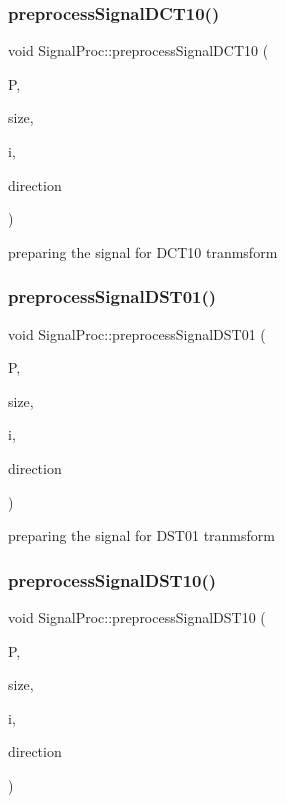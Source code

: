 \subsubsection{\texorpdfstring{preprocess\+Signal\+D\+C\+T10()}{preprocessSignalDCT10()}}
{\footnotesize\ttfamily void Signal\+Proc\+::preprocess\+Signal\+D\+C\+T10 (\begin{DoxyParamCaption}\item[{\mbox{\hyperlink{classChunkedArray}{Chunked\+Array}} \&}]{P,  }\item[{const int}]{size,  }\item[{const int}]{i,  }\item[{const int}]{direction }\end{DoxyParamCaption})}

preparing the signal for D\+C\+T10 tranmsform \mbox{\label{classSignalProc_a163a1a849ac2a30aa756c8d45b40dde1}} 
\subsubsection{\texorpdfstring{preprocess\+Signal\+D\+S\+T01()}{preprocessSignalDST01()}}
{\footnotesize\ttfamily void Signal\+Proc\+::preprocess\+Signal\+D\+S\+T01 (\begin{DoxyParamCaption}\item[{\mbox{\hyperlink{classChunkedArray}{Chunked\+Array}} \&}]{P,  }\item[{const int}]{size,  }\item[{const int}]{i,  }\item[{const int}]{direction }\end{DoxyParamCaption})}

preparing the signal for D\+S\+T01 tranmsform \mbox{\label{classSignalProc_a76b93fa1929f4f80d1ddeb93c5d3eac1}} 
\subsubsection{\texorpdfstring{preprocess\+Signal\+D\+S\+T10()}{preprocessSignalDST10()}}
{\footnotesize\ttfamily void Signal\+Proc\+::preprocess\+Signal\+D\+S\+T10 (\begin{DoxyParamCaption}\item[{\mbox{\hyperlink{classChunkedArray}{Chunked\+Array}} \&}]{P,  }\item[{const int}]{size,  }\item[{const int}]{i,  }\item[{const int}]{direction }\end{DoxyParamCaption})}

